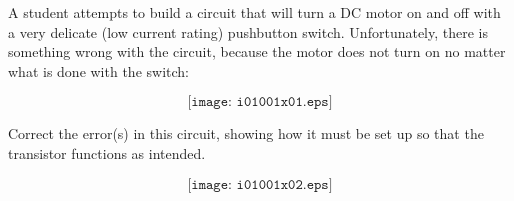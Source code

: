 

A student attempts to build a circuit that will turn a DC motor on and off with a very delicate (low current rating) pushbutton switch.  Unfortunately, there is something wrong with the circuit, because the motor does not turn on no matter what is done with the switch:

$$\texttt{[image: i01001x01.eps]}$$

Correct the error(s) in this circuit, showing how it must be set up so that the transistor functions as intended.







$$\texttt{[image: i01001x02.eps]}$$











